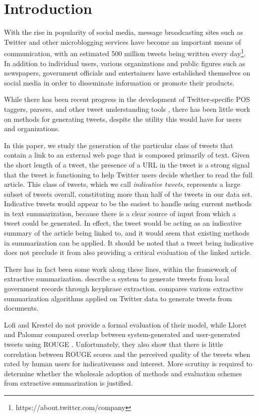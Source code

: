 \section{Introduction}
\label{sec:intro}
With the rise in popularity of social media, message broadcasting sites such as Twitter and other microblogging services have become an important means of communication, with an estimated 500 million tweets being written every day\footnote{https://about.twitter.com/company}. In addition to individual users, various organizations and public figures such as newspapers, government officials and entertainers have established themselves on social media in order to disseminate information or promote their products. 

While there has been recent progress in the development of Twitter-specific POS taggers, parsers, and other tweet understanding tools \cite{owoputi-etal-2013,kong-etal-2014}, there has been little work on methods for generating tweets, despite the utility this would have for users and organizations. 

In this paper, we study the generation of the particular class of tweets that contain a link to an external web page that is composed primarily of text. Given the short length of a tweet, the presence of a URL in the tweet is a strong signal that the tweet is functioning to help Twitter users decide whether to read the full article. This class of tweets, which we call \emph{indicative tweets}, represents a large subset of tweets overall, constituting more than half of the tweets in our data set. Indicative tweets would appear to be the easiest to handle using current methods in text summarization, because there is a clear source of input from which a tweet could be generated. In effect, the tweet would be acting as an indicative summary of the article being linked to, and it would seem that existing methods in summarization can be applied. It should be noted that a tweet being indicative does not preclude it from also providing a critical evaluation of the linked article.

There has in fact been some work along these lines, within the framework of extractive summarization.  describe a system to generate tweets from local government records through keyphrase extraction.  compares various extractive summarization algorithms applied on Twitter data to generate tweets from documents. 

Lofi and Krestel do not provide a formal evaluation of their model, while Lloret and Palomar compared overlap between system-generated and user-generated tweets using ROUGE 
\cite{lin2004rouge}. Unfortunately, they also show that there is little correlation between ROUGE scores and the perceived quality of the tweets when rated by human users for indicativeness and interest. More scrutiny is required to determine whether the wholesale adoption of methods and evaluation schemes from extractive summarization is justified.

